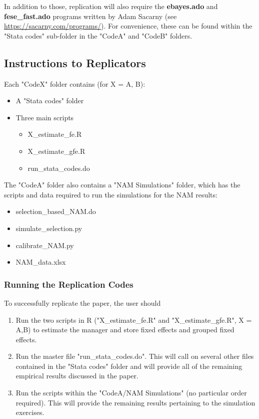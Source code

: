 \documentclass[
]{article}
\begin{document}
In addition to those, replication will also require the \textbf{ebayes.ado} and \textbf{fese\_fast.ado} programs written by Adam Sacarny (see \url{https://sacarny.com/programs/}). For convenience, these can be found within the "Stata codes" sub-folder in the "CodeA" and "CodeB" folders.


\subsection{Instructions to Replicators}

Each "CodeX" folder contains (for X = A, B):
\begin{itemize}
    \item A "Stata codes" folder
    \item Three main scripts
        \begin{itemize}
            \item X\_estimate\_fe.R
            \item X\_estimate\_gfe.R
            \item run\_stata\_codes.do
        \end{itemize}
\end{itemize}

The "CodeA" folder also contains a "NAM Simulations" folder, which has the scripts and data required to run the simulations for the NAM results:
\begin{itemize}
    \item selection\_based\_NAM.do
    \item simulate\_selection.py
    \item calibrate\_NAM.py
    \item NAM\_data.xlsx
\end{itemize}

\subsubsection{Running the Replication Codes}

To successfully replicate the paper, the user should
\begin{enumerate}
    \item Run the two scripts in R ("X\_estimate\_fe.R" and "X\_estimate\_gfe.R", X = A,B) to estimate the manager and store fixed effects and grouped fixed effects. 
    \item Run the master file "run\_stata\_codes.do". This will call on several other files contained in the "Stata codes" folder and will provide all of the remaining empirical results discussed in the paper.
    \item Run the scripts within the "CodeA/NAM Simulations" (no particular order required). This will provide the remaining results pertaining to the simulation exercises.
\end{enumerate}
\end{document}
